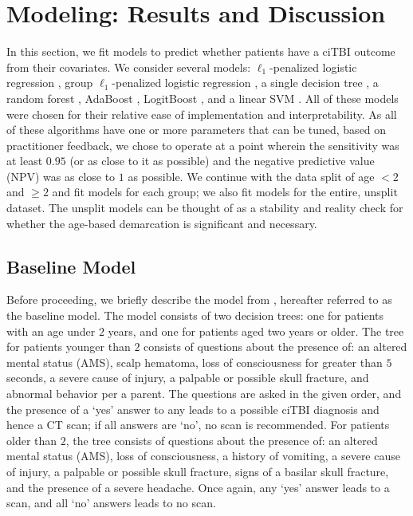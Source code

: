 \documentclass[11pt, letterpaper]{amsart}
\let\Oldsection\section
\renewcommand{\section}{\FloatBarrier\Oldsection}
\let\Oldsubsection\subsection
\renewcommand{\subsection}{\FloatBarrier\Oldsubsection}
\begin{document}
\section{Modeling: Results and Discussion}

In this section, we fit models to predict whether patients have a ciTBI outcome from their covariates. We consider several models: $\ell_1$-penalized logistic regression \cite{simon2013sparse}, group $\ell_1$-penalized logistic regression \cite{simon2013sparse}, a single decision tree \cite{safavian1991survey}, a random forest \cite{ho1995random}, AdaBoost \cite{schapire2013explaining}, LogitBoost \cite{cai2006using}, and a linear SVM \cite{boser1992training}. All of these models were chosen for their relative ease of implementation and interpretability. As all of these algorithms have one or more parameters that can be tuned, based on practitioner feedback, we chose to operate at a point wherein the sensitivity was at least $0.95$ (or as close to it as possible) and the negative predictive value (NPV) was as close to $1$ as possible. We continue with the data split of age $< 2$ and $\geq 2$ and fit models for each group; we also fit models for the entire, unsplit dataset. The unsplit models can be thought of as a stability and reality check for whether the age-based demarcation is significant and necessary. 

\subsection{Baseline Model}

Before proceeding, we briefly describe the model from \cite{kuppermann2009identification}, hereafter referred to as the baseline model. The model consists of two decision trees: one for patients with an age under $2$ years, and one for patients aged two years or older. The tree for patients younger than $2$ consists of questions about the presence of: an altered mental status (AMS), scalp hematoma, loss of consciousness for greater than $5$ seconds, a severe cause of injury, a palpable or possible skull fracture, and abnormal behavior per a parent. The questions are asked in the given order, and the presence of a `yes' answer to any leads to a possible ciTBI diagnosis and hence a CT scan; if all answers are `no', no scan is recommended. For patients older than $2$, the tree consists of questions about the presence of: an altered mental status (AMS), loss of consciousness, a history of vomiting, a severe cause of injury, a palpable or possible skull fracture, signs of a basilar skull fracture, and the presence of a severe headache. Once again, any `yes' answer leads to a scan, and all `no' answers leads to no scan. 
\end{document}
